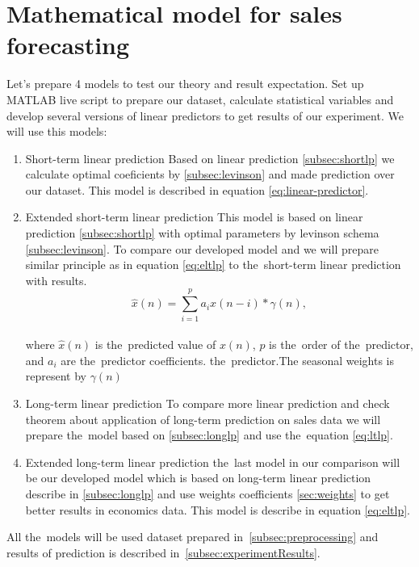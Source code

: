\section{Mathematical model for sales forecasting}\label{subsec:calculate_models}
Let's prepare 4 models to test our theory and result expectation.  Set up MATLAB live script to prepare our dataset,
calculate statistical variables and develop several versions of linear predictors to get results of our experiment.
We will use this models:
\begin{enumerate}
    \item Short-term linear prediction 
    Based on linear prediction \ref{subsec:shortlp} we calculate optimal coeficients by \ref{subsec:levinson} and
    made prediction over our dataset. This model is described in equation \ref{eq:linear-predictor}.

    \item Extended short-term linear prediction 
    This model is based on linear prediction \ref{subsec:shortlp} with optimal parameters by levinson
    schema \ref{subsec:levinson}. To compare our developed model \label{subsec:extlonglp} and we will prepare
    similar principle as in equation \ref{eq:eltlp} to the~short-term linear prediction with results.
    \begin{equation} \label{eq:slp}
        \hat{x}(n) = \sum_{i=1}^{p} a_i x(n-i) * \gamma(n),
    \end{equation}
    \\
    where $\hat{x}(n)$ is the~predicted value of $x(n)$, $p$ is the~order of the~predictor, and $a_i$ are the~predictor coefficients. the~predictor.The seasonal weights is represent by $\gamma(n)$

    \item Long-term linear prediction 
    To compare more linear prediction and check theorem about application of long-term prediction on sales data
    we will prepare the~model based on \ref{subsec:longlp} and use the~equation \ref{eq:ltlp}.

    \item Extended long-term linear prediction
     the~last model in our comparison will be our developed model which is based on long-term linear prediction
    describe in \ref{subsec:longlp} and use weights coefficients \ref{sec:weights} to get better results in
    economics data. This model is describe in equation \ref{eq:eltlp}.
\end{enumerate}
All the~models will be used dataset prepared in~\ref{subsec:preprocessing} and results of prediction is
described in~\ref{subsec:experimentResults}.
